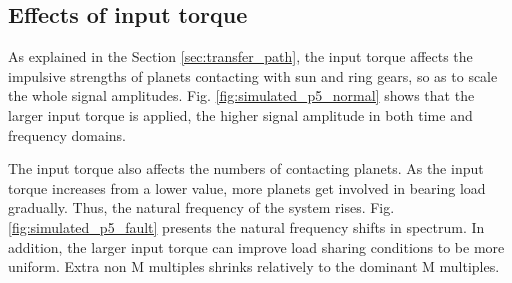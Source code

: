 \documentclass[a4paper,fleqn]{cas-sc}%
\begin{document}
\subsection{Effects of input torque}
\par As explained in the Section \ref{sec:transfer_path}, the input torque affects the impulsive strengths of planets contacting with sun and ring gears, so as to scale the whole signal amplitudes. Fig. \ref{fig:simulated_p5_normal} shows that the larger input torque is applied, the higher signal amplitude in both time and frequency domains. 
\par The input torque also affects the numbers of contacting planets. As the input torque increases from a lower value, more planets get involved in bearing load gradually. Thus, the natural frequency of the system rises. Fig. \ref{fig:simulated_p5_fault} presents the natural frequency shifts in spectrum. In addition, the larger input torque can improve load sharing conditions to be more uniform. Extra non M multiples shrinks relatively to the dominant M multiples. 
\end{document}
